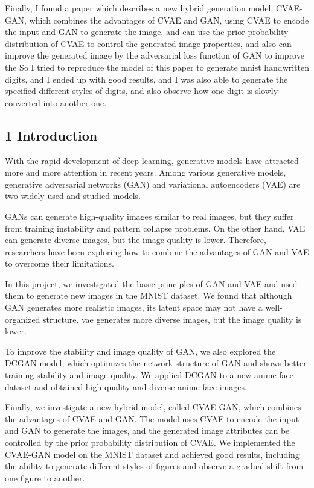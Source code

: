\documentclass[
]{article}
\begin{document}
Finally, I found a paper which describes a new hybrid generation model:
CVAE-GAN, which combines the advantages of CVAE and GAN, using CVAE to
encode the input and GAN to generate the image, and can use the prior
probability distribution of CVAE to control the generated image
properties, and also can improve the generated image by the adversarial
loss function of GAN to improve the So I tried to reproduce the model of
this paper to generate mnist handwritten digits, and I ended up with
good results, and I was also able to generate the specified different
styles of digits, and also observe how one digit is slowly converted
into another one.

\hypertarget{1-introduction}{%
\subsection{1 Introduction}\label{1-introduction}}

With the rapid development of deep learning, generative models have
attracted more and more attention in recent years. Among various
generative models, generative adversarial networks (GAN) and variational
autoencoders (VAE) are two widely used and studied models.

GANs can generate high-quality images similar to real images, but they
suffer from training instability and pattern collapse problems. On the
other hand, VAE can generate diverse images, but the image quality is
lower. Therefore, researchers have been exploring how to combine the
advantages of GAN and VAE to overcome their limitations.

In this project, we investigated the basic principles of GAN and VAE and
used them to generate new images in the MNIST dataset. We found that
although GAN generates more realistic images, its latent space may not
have a well-organized structure. vae generates more diverse images, but
the image quality is lower.

To improve the stability and image quality of GAN, we also explored the
DCGAN model, which optimizes the network structure of GAN and shows
better training stability and image quality. We applied DCGAN to a new
anime face dataset and obtained high quality and diverse anime face
images.

Finally, we investigate a new hybrid model, called CVAE-GAN, which
combines the advantages of CVAE and GAN. The model uses CVAE to encode
the input and GAN to generate the images, and the generated image
attributes can be controlled by the prior probability distribution of
CVAE. We implemented the CVAE-GAN model on the MNIST dataset and
achieved good results, including the ability to generate different
styles of figures and observe a gradual shift from one figure to
another.
\end{document}
